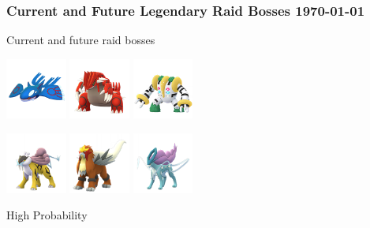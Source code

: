 \documentclass[12pt]{beamer}
\begin{document}
\begin{frame}
\frametitle{Current and Future Legendary Raid Bosses \hspace{7.5cm} \today}

\begin{block}{}
\begin{footnotesize}

\begin{center}
Current and future raid bosses

 \includegraphics[width=2cm]{../../images/pokemon/kyogre.png}\quad\quad
 \includegraphics[width=2cm]{../../images/pokemon/groudon.png}\quad\quad
 \includegraphics[width=2cm]{../../images/pokemon/regigigas.png}
 
 \includegraphics[width=2cm]{../../images/pokemon/raikou.png}\quad\quad
 \includegraphics[width=2cm]{../../images/pokemon/entei.png}\quad\quad
 \includegraphics[width=2cm]{../../images/pokemon/suicune.png}

\bigskip\bigskip

High Probability 


\end{center}
\end{footnotesize}
\end{block}
\end{frame}
\end{document}
